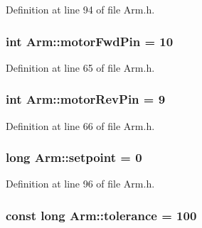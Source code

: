 Definition at line 94 of file Arm.\-h.

\hypertarget{classArm_ad4a5718ff10ff30ece49108effc28dd2}{
\subsubsection[{motor\-Fwd\-Pin}]{\setlength{\rightskip}{0pt plus 5cm}int Arm\-::motor\-Fwd\-Pin = 10\hspace{0.3cm}{\ttfamily [private]}}}\label{classArm_ad4a5718ff10ff30ece49108effc28dd2}


Definition at line 65 of file Arm.\-h.

\hypertarget{classArm_a0d5927881e33ce4e039a71e83d7caf6a}{
\subsubsection[{motor\-Rev\-Pin}]{\setlength{\rightskip}{0pt plus 5cm}int Arm\-::motor\-Rev\-Pin = 9\hspace{0.3cm}{\ttfamily [private]}}}\label{classArm_a0d5927881e33ce4e039a71e83d7caf6a}


Definition at line 66 of file Arm.\-h.

\hypertarget{classArm_aa168ca685ff8170699ca535590c2af14}{
\subsubsection[{setpoint}]{\setlength{\rightskip}{0pt plus 5cm}long Arm\-::setpoint = 0\hspace{0.3cm}{\ttfamily [private]}}}\label{classArm_aa168ca685ff8170699ca535590c2af14}


Definition at line 96 of file Arm.\-h.

\hypertarget{classArm_afb4e56fd59b92d0b4c157c0ea7fe9db8}{
\subsubsection[{tolerance}]{\setlength{\rightskip}{0pt plus 5cm}const long Arm\-::tolerance = 100\hspace{0.3cm}{\ttfamily [private]}}}\label{classArm_afb4e56fd59b92d0b4c157c0ea7fe9db8}


